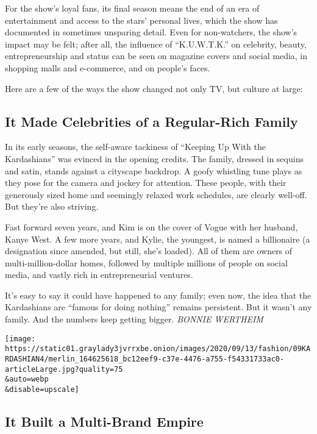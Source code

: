 For the show's loyal fans, its final season means the end of an era of
entertainment and access to the stars' personal lives, which the show
has documented in sometimes unsparing detail. Even for non-watchers, the
show's impact may be felt; after all, the influence of ``K.U.W.T.K.'' on
celebrity, beauty, entrepreneurship and status can be seen on magazine
covers and social media, in shopping malls and e-commerce, and on
people's faces.

Here are a few of the ways the show changed not only TV, but culture at
large:

\hypertarget{it-made-celebrities-of-a-regular-rich-family}{%
\subsection{It Made Celebrities of a Regular-Rich
Family}\label{it-made-celebrities-of-a-regular-rich-family}}

In its early seasons, the self-aware tackiness of ``Keeping Up With the
Kardashians'' was evinced in the opening credits. The family, dressed in
sequins and satin, stands against a cityscape backdrop. A goofy
whistling tune plays as they pose for the camera and jockey for
attention. These people, with their generously sized home and seemingly
relaxed work schedules, are clearly well-off. But they're also striving.

Fast forward seven years, and Kim is on the cover of Vogue with her
husband, Kanye West. A few more years, and Kylie, the youngest, is named
a billionaire (a designation since amended, but still, she's loaded).
All of them are owners of multi-million-dollar homes, followed by
multiple millions of people on social media, and vastly rich in
entrepreneurial ventures.

It's easy to say it could have happened to any family; even now, the
idea that the Kardashians are ``famous for doing nothing'' remains
persistent. But it wasn't any family. And the numbers keep getting
bigger. \emph{BONNIE WERTHEIM}

\texttt{[image: https://static01.graylady3jvrrxbe.onion/images/2020/09/13/fashion/09KARDASHIAN4/merlin\_164625618\_bc12eef9-c37e-4476-a755-f54331733ac0-articleLarge.jpg?quality=75\\\&auto=webp\\\&disable=upscale]}

\hypertarget{it-built-a-multi-brand-empire}{%
\subsection{It Built a Multi-Brand
Empire}\label{it-built-a-multi-brand-empire}}

